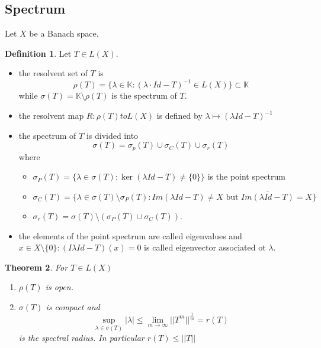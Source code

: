 \documentclass[a4paper, 12pt]{article}
\theoremstyle{plain}
\newtheorem{theorem}{Theorem}[subsection] %
\theoremstyle{definition}
\newtheorem{definition}[theorem]{Definition} %
\theoremstyle{lemma}
\theoremstyle{remark}
\theoremstyle{corollary}
\theoremstyle{example}
\begin{document}
	\subsection{Spectrum}
	Let $X$ be a Banach space.
	\begin{definition}
		Let $T\in L(X)$. \begin{itemize}
			\item the resolvent set of $T$ is \[\rho(T) = \{\lambda \in \mathbb{K}: (\lambda \cdot Id - T)^{-1}\in L(X)\}\subset \mathbb{K}\]
			while $\sigma(T) = \mathbb{K}\setminus \rho(T)$ is the spectrum of $T$.
			\item the resolvent map $R: \rho(T) to L(X)$ is defined by $\lambda \mapsto (\lambda Id - T)^{-1}$
			\item the spectrum of $T$ is divided into \[\sigma(T) = \sigma_p(T)\cup \sigma_C(T) \cup \sigma_r(T)\] where \begin{itemize}
				\item $\sigma_P(T) = \{\lambda \in \sigma(T): \ker (\lambda Id - T) \neq \{0\}\}$ is the point spectrum
				\item $\sigma_C(T) = \{\lambda \in \sigma(T)\setminus \sigma_P(T): Im (\lambda Id- T) \neq X \text{ but } \overline{Im (\lambda Id - T)} = X\}$
				\item $\sigma_r(T) = \sigma(T) \setminus (\sigma_P(T) \cup \sigma_C(T))$.
			\end{itemize}
			\item the elements of the point spectrum are called eigenvalues and $x \in X\setminus \{0\}: (I\lambda Id - T)(x) = 0$ is called eigenvector associated ot $\lambda$.
		\end{itemize}
	\end{definition}
	\begin{theorem}
		For $T\in L(X)$ \begin{enumerate}
			\item $\rho(T)$ is open.
			\item $\sigma(T)$ is compact and \[\sup_{\lambda \in \sigma(T)} \left|\lambda\right| \leq \lim_{m \to \infty} ||T^m||^{\frac{1}{m}} = r(T)\] is the spectral radius. In particular $r(T) \leq ||T||$
		\end{enumerate}
	\end{theorem}
\end{document}
